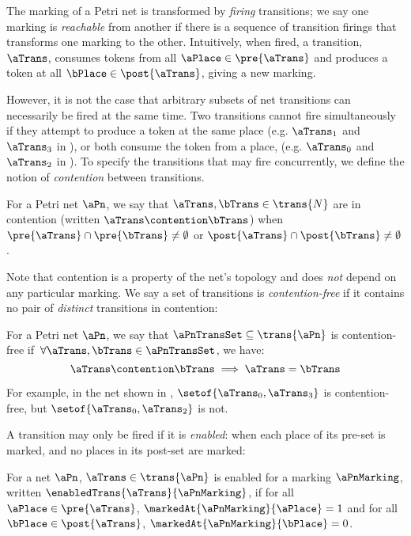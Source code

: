The marking of a Petri net is transformed by \emph{firing} transitions; we say
one marking is \emph{reachable} from another if there is a sequence of
transition firings that transforms one marking to the other. Intuitively, when
fired, a transition, $\aTrans$, consumes tokens from all $\aPlace \in
\pre{\aTrans}$ and produces a token at all $\bPlace \in \post{\aTrans}$, giving
a new marking.

However, it is not the case that arbitrary subsets of net transitions can
necessarily be fired at the same time. Two transitions cannot fire
simultaneously if they attempt to produce a token at the same place (e.g.
$\aTrans_1$ and $\aTrans_3$ in ), or both consume
the token from a place, (e.g. $\aTrans_0$ and $\aTrans_2$ in
). To specify the transitions that may fire
concurrently, we define the notion of \emph{contention} between transitions.

\begin{definition}
    For a Petri net $\aPn$, we say that $\aTrans, \bTrans \in
    \trans{N}$ are in contention (written $\aTrans \contention \bTrans$)
    when $\pre{\aTrans} \cap \pre{\bTrans} \neq \emptyset$ or
    $\post{\aTrans} \cap \post{\bTrans} \neq \emptyset$.
\end{definition}

Note that contention is a property of the net's topology and does \emph{not}
depend on any particular marking. We say a set of transitions is
\emph{contention-free} if it contains no pair of \emph{distinct} transitions in
contention:

\begin{definition}\label{defn:pnContentionFreeSet}
    For a Petri net $\aPn$, we say that $\aPnTransSet \subseteq \trans{\aPn}$
    is contention-free if $\,\forall \aTrans, \bTrans \in \aPnTransSet$, we
    have:
    \[
        \aTrans \contention \bTrans \implies \aTrans = \bTrans
    \]
\end{definition}

For example, in the net shown in , $\setof{\aTrans_0,
\aTrans_3}$ is contention-free, but $\setof{\aTrans_0,\aTrans_2}$ is not.

A transition may only be fired if it is \emph{enabled}: when each place of its
pre-set is marked, and no places in its post-set are marked:

\begin{definition}\label{defn:pnEnabledTrans}
For a net $\aPn$, $\aTrans \in \trans{\aPn}$ is enabled for a marking
$\aPnMarking$, written $\enabledTrans{\aTrans}{\aPnMarking}$, if for all
$\aPlace \in \pre{\aTrans}$, $\markedAt{\aPnMarking}{\aPlace} = 1$ and
for all $\bPlace \in \post{\aTrans}$, $\markedAt{\aPnMarking}{\bPlace}
= 0$.
\end{definition}

